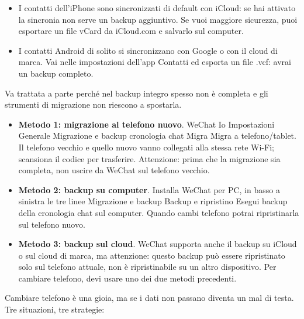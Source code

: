 
\begin{itemize}
  \item I contatti dell'iPhone sono sincronizzati di default con iCloud: se hai attivato la sincronia non serve un backup aggiuntivo. Se vuoi maggiore sicurezza, puoi esportare un file vCard da iCloud.com e salvarlo sul computer.
  \item I contatti Android di solito si sincronizzano con Google o con il cloud di marca. Vai nelle impostazioni dell'app Contatti ed esporta un file .vcf: avrai un backup completo.
\end{itemize}


Va trattata a parte perché nel backup integro spesso non è completa e gli strumenti di migrazione non riescono a spostarla.

\begin{itemize}
  \item \textbf{Metodo 1: migrazione al telefono nuovo}. WeChat Io Impostazioni Generale Migrazione e backup cronologia chat Migra Migra a telefono/tablet. Il telefono vecchio e quello nuovo vanno collegati alla stessa rete Wi-Fi; scansiona il codice per trasferire. Attenzione: prima che la migrazione sia completa, non uscire da WeChat sul telefono vecchio.
  \item \textbf{Metodo 2: backup su computer}. Installa WeChat per PC, in basso a sinistra le tre linee Migrazione e backup Backup e ripristino Esegui backup della cronologia chat sul computer. Quando cambi telefono potrai ripristinarla sul telefono nuovo.
  \item \textbf{Metodo 3: backup sul cloud}. WeChat supporta anche il backup su iCloud o sul cloud di marca, ma attenzione: questo backup può essere ripristinato solo sul telefono attuale, non è ripristinabile su un altro dispositivo. Per cambiare telefono, devi usare uno dei due metodi precedenti.
\end{itemize}


Cambiare telefono è una gioia, ma se i dati non passano diventa un mal di testa. Tre situazioni, tre strategie:


